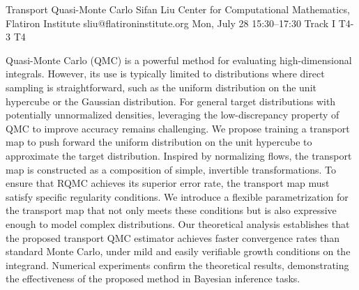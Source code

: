 \begin{talk}
  {Transport Quasi-Monte Carlo}%
  {Sifan Liu}%
  {Center for Computational Mathematics, Flatiron Institute}%
  {sliu@flatironinstitute.org}%
  {}%
  {}%
  {Mon, July 28 15:30–17:30 Track I}%
  {T4-3}%
  {T4}%
			
Quasi-Monte Carlo (QMC) is a powerful method for evaluating high-dimensional integrals. However, its use is typically limited to distributions where direct sampling is straightforward, such as the uniform distribution on the unit hypercube or the Gaussian distribution. For general target distributions with potentially unnormalized densities, leveraging the low-discrepancy property of QMC to improve accuracy remains challenging. We propose training a transport map to push forward the uniform distribution on the unit hypercube to approximate the target distribution. Inspired by normalizing flows, the transport map is constructed as a composition of simple, invertible transformations. To ensure that RQMC achieves its superior error rate, the transport map must satisfy specific regularity conditions. We introduce a flexible parametrization for the transport map that not only meets these conditions but is also expressive enough to model complex distributions. Our theoretical analysis establishes that the proposed transport QMC estimator achieves faster convergence rates than standard Monte Carlo, under mild and easily verifiable growth conditions on the integrand. Numerical experiments confirm the theoretical results, demonstrating the effectiveness of the proposed method in Bayesian inference tasks.


\medskip


\end{talk}

